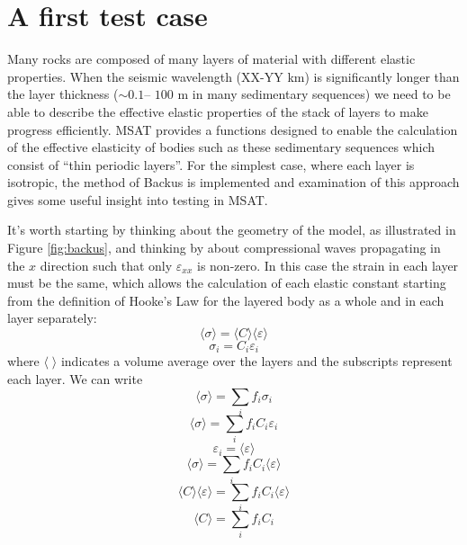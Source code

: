 \documentclass[11pt, oneside]{article}   	%
\begin{document}
\section{A first test case}

Many rocks are composed of many layers of material with different elastic properties. When
the seismic wavelength (XX-YY km) is significantly longer than the layer thickness ($\sim0.1$--
$100$ m in many sedimentary sequences) we need to be able to describe the effective elastic
properties of the stack of layers to make progress efficiently. MSAT provides a functions designed
to enable the calculation of the effective elasticity of bodies such as these sedimentary sequences
which consist of ``thin periodic layers''. For the simplest case, where each layer is isotropic, the 
method of Backus \cite{Backus1962} is implemented and examination of this approach gives some
useful insight into testing in MSAT.

It's worth starting by thinking about the geometry of the model, as illustrated in Figure \ref{fig:backus}, 
and thinking by about compressional waves propagating in the $x$ direction such that only $\varepsilon_{xx}$
is non-zero. In this case the strain in each layer must be the same, which allows the calculation of each
elastic constant starting from the definition of Hooke's Law for the layered body as a whole and in each layer separately:
\begin{equation}
\langle \sigma \rangle = \langle C \rangle \langle \varepsilon \rangle
\end{equation}
\begin{equation}
\sigma_i = C_i \varepsilon_i
\end{equation}
where $\langle \; \rangle$ indicates a volume average over the layers and the subscripts represent each layer. 
We can write 
\begin{equation}
\langle \sigma \rangle = \sum_i f_i \sigma_i
\end{equation}
\begin{equation}
\langle \sigma \rangle = \sum_i f_i C_i \varepsilon_i
\end{equation}
\begin{equation}
\varepsilon_i =  \langle \varepsilon \rangle
\end{equation}
\begin{equation}
\langle \sigma \rangle = \sum_i f_i C_i \langle \varepsilon \rangle
\end{equation}
\begin{equation}
\langle C \rangle \langle \varepsilon \rangle = \sum_i f_i C_i \langle \varepsilon \rangle
\end{equation}
\begin{equation}
\langle C \rangle = \sum_i f_i C_i 
\end{equation}
\end{document}
